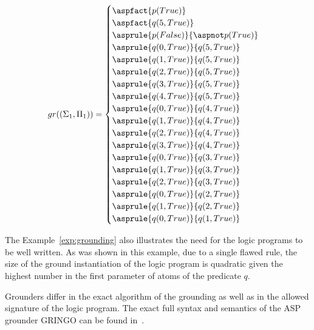 \begin{example}
    \begin{equation*}
        gr((\Sigma_1, \Pi_1)) =
            \begin{cases}
                \aspfact{p(True)}\\
                \aspfact{q(5, True)}\\
                \asprule{p(False)}{\aspnot p(True)}\\
                \asprule{q(0, True)}{q(5, True)}\\
                \asprule{q(1, True)}{q(5, True)}\\
                \asprule{q(2, True)}{q(5, True)}\\
                \asprule{q(3, True)}{q(5, True)}\\
                \asprule{q(4, True)}{q(5, True)}\\
                \asprule{q(0, True)}{q(4, True)}\\
                \asprule{q(1, True)}{q(4, True)}\\
                \asprule{q(2, True)}{q(4, True)}\\
                \asprule{q(3, True)}{q(4, True)}\\
                \asprule{q(0, True)}{q(3, True)}\\
                \asprule{q(1, True)}{q(3, True)}\\
                \asprule{q(2, True)}{q(3, True)}\\
                \asprule{q(0, True)}{q(2, True)}\\
                \asprule{q(1, True)}{q(2, True)}\\
                \asprule{q(0, True)}{q(1, True)}\\
            \end{cases}
    \end{equation*}
\end{example}

The Example~\ref{exp:grounding} also illustrates the need for the logic programs
to be well written. As was shown in this example, due to a single flawed rule,
the size of the ground instantiation of the logic program is quadratic
given the highest number in the first parameter of atoms of the predicate $q$.

Grounders differ in the exact algorithm of the grounding as well as in the
allowed signature of the logic program.
The exact full syntax and semantics
of the ASP grounder GRINGO can be found in~\cite{GEBSER_2015}.


